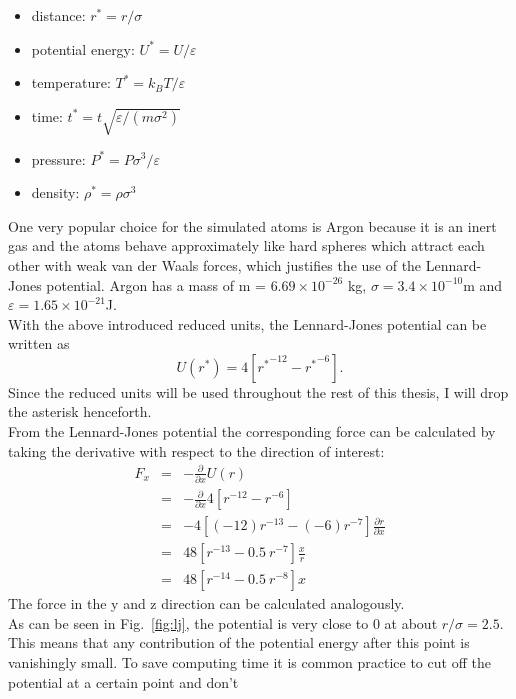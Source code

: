 \documentclass[12pt]{article}
\begin{document}
\begin{itemize}
    \item {distance:} $r^* = r/\sigma$
    \item {potential energy:} $U^* = U/\varepsilon$
    \item {temperature:} $T^* = k_B T/\varepsilon$
    \item {time:} $t^* = t\sqrt{\varepsilon/(m\sigma^2)}$
    \item {pressure:} $P^* = P\sigma^3/\varepsilon$
    \item {density:} $\rho^* = \rho \sigma^3$
\end{itemize}
One very popular choice for the simulated atoms is Argon because it is an inert gas and the atoms behave 
approximately like hard spheres which attract each other with weak van der Waals forces, which justifies the use of the Lennard-Jones potential. 
Argon has a mass of m = $6.69 \times 10^{-26}$ kg, $\sigma = 3.4 \times 10^{-10}$m and $\varepsilon = 1.65 \times 10^{-21}$J.\\
With the above introduced reduced units, the Lennard-Jones potential can be written as
\begin{equation}
    U(r^*) = 4\left[{r^*}^{-12} - {r^*}^{-6}\right].
\end{equation}
Since the reduced units will be used throughout the rest of this thesis, I will drop the asterisk henceforth.\\
From the Lennard-Jones potential the corresponding force can be calculated by taking the derivative with respect to the direction of interest:
\begin{eqnarray}
    F_{x} &=& -\frac{\partial}{\partial x} U(r) \nonumber\\
                &=& -\frac{\partial}{\partial x} 4\left[{r}^{-12} - {r}^{-6}\right] \nonumber\\
                &=& -4 \left[(-12){r}^{-13} - (-6){r}^{-7}\right] \frac{\partial r}{\partial x} \nonumber\\
                &=& 48 \left[r^{-13} - 0.5 \ r^{-7}\right] \frac{x}{r} \nonumber\\
    \label{eq:ljforce} &=& 48 \left[r^{-14} - 0.5 \ r^{-8}\right] x
\end{eqnarray}
The force in the y and z direction can be calculated analogously.\\
As can be seen in Fig.~\ref{fig:lj}, the potential is very close to 0 at about $r/\sigma=2.5$. This means that any contribution of the potential
energy after this point is vanishingly small. To save computing time it is common practice to cut off the potential at a certain point and don't
\end{document}
